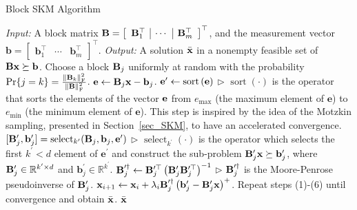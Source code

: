 \documentclass[12pt,draftcls,onecolumn]{IEEEtran}
\begin{document}
\begin{algorithm}[t]
\caption{Block SKM Algorithm}
\label{algorithm_2}
\begin{algorithmic}[1]
\Statex \emph{Input:} A block matrix $\mathbf{B}=\left[\begin{array}{c|c|c}\mathbf{B}^{\top}_{1} &\cdots&\mathbf{B}^{\top}_{m}\end{array}\right]^{\top}$, and the measurement vector $\mathbf{b}=\left[\begin{array}{c|c|c}\mathbf{b}^{\top}_{1} &\cdots&\mathbf{b}^{\top}_{m}\end{array}\right]^{\top}$.
\Statex \emph{Output:} A solution $\bar{\mathbf{x}}$ in a nonempty feasible set of $\mathbf{B}\mathbf{x}\succeq\mathbf{b}$.
\State Choose a block $\mathbf{B}_{j}$ uniformly at random with the probability $\operatorname{Pr}\{j=k\}=\frac{\left\|\mathbf{B}_{k}\right\|^{2}_{\mathrm{F}}}{\|\mathbf{B}\|_{\mathrm{F}}^{2}}$.
\State $\mathbf{e}\gets\mathbf{B}_{j}\mathbf{x}-\mathbf{b}_{j}$.
\State $\mathbf{e}^{\prime}\gets\operatorname{sort}\left(\mathbf{e}\right)$ $\triangleright$ $\operatorname{sort}(\cdot)$ is the operator that sorts the elements of the vector $\mathbf{e}$ from $e_{\mathrm{max}}$ (the maximum element of $\mathbf{e}$) to $e_{\mathrm{min}}$ (the minimum element of $\mathbf{e}$). This step is inspired by the idea of the Motzkin sampling, presented in Section~\ref{sec_SKM}, to have an accelerated convergence.
\State $[\mathbf{B}_{j}^{\prime},\mathbf{b}_{j}^{\prime}]=\operatorname{select}_{k^{\prime}}(\mathbf{B}_{j},\mathbf{b}_{j},\mathbf{e}^{\prime})$ $\triangleright$ $\operatorname{select}_{k^{\prime}}(\cdot)$ is the operator which selects the first $k^{\prime}<d$ element of $\mathbf{e}^{\prime}$ and construct the sub-problem $\mathbf{B}_{j}^{\prime}\mathbf{x}	\succeq\mathbf{b}_{j}^{\prime}$, where $\mathbf{B}_{j}^{\prime}\in\mathbb{R}^{k^{\prime}\times d}$ and $\mathbf{b}_{j}^{\prime}\in\mathbb{R}^{k^{\prime}}$.
\State $\mathbf{B}_{j}^{\prime\dagger}\gets\mathbf{B}_{j}^{\prime\top}\left(\mathbf{B}_{j}^{\prime}\mathbf{B}_{j}^{\prime\top}\right)^{-1}$ $\triangleright$ $\mathbf{B}_{j}^{\prime\dagger}$ is the Moore-Penrose pseudoinverse of $\mathbf{B}_{j}^{\prime}$.
\State $\mathbf{x}_{i+1}\gets\mathbf{x}_{i}+\lambda_{i}\mathbf{B}_{j}^{\prime\dagger}\left(\mathbf{b}_{j}^{\prime}-\mathbf{B}_{j}^{\prime}\mathbf{x}\right)^{+}$.
\State Repeat steps (1)-(6) until convergence and obtain $\bar{\mathbf{x}}$.
\State \Return $\bar{\mathbf{x}}$
\end{algorithmic}
\end{algorithm}
\end{document}
